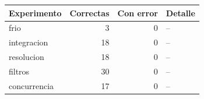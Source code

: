 \begin{tabular}{lrrl}
\toprule
Experimento & Correctas & Con error & Detalle \\
\midrule
frio & 3 & 0 & -- \\
integracion & 18 & 0 & -- \\
resolucion & 18 & 0 & -- \\
filtros & 30 & 0 & -- \\
concurrencia & 17 & 0 & -- \\
\bottomrule
\end{tabular}
